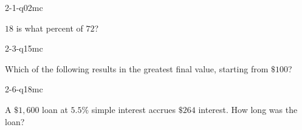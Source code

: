 \begin{practiceQuestion}{2-1-q02}{mc}
\begin{questionText}
$18$ is what percent of $72$?
\end{questionText}
\end{practiceQuestion}

\begin{practiceQuestion}{2-3-q15}{mc}
\begin{questionText}
Which of the following results in the greatest final value, starting from $\$100$?
\end{questionText}
\end{practiceQuestion}

\begin{practiceQuestion}{2-6-q18}{mc}
\begin{questionText}
A $\$1{,}600$ loan at $5.5\%$ simple interest accrues $\$264$ interest. How long was the loan?
\end{questionText}
\end{practiceQuestion}

